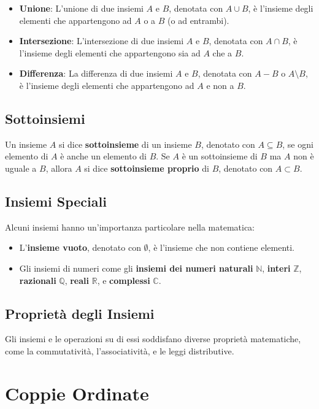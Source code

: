 \documentclass{article}
\begin{document}
\begin{itemize}
    \item \textbf{Unione}: L'unione di due insiemi $A$ e $B$, denotata con $A \cup B$, è l'insieme degli elementi che appartengono ad $A$ o a $B$ (o ad entrambi).
    \item \textbf{Intersezione}: L'intersezione di due insiemi $A$ e $B$, denotata con $A \cap B$, è l'insieme degli elementi che appartengono sia ad $A$ che a $B$.
    \item \textbf{Differenza}: La differenza di due insiemi $A$ e $B$, denotata con $A - B$ o $A \setminus B$, è l'insieme degli elementi che appartengono ad $A$ e non a $B$.
\end{itemize}

\subsection{Sottoinsiemi}
Un insieme $A$ si dice \textbf{sottoinsieme} di un insieme $B$, denotato con $A \subseteq B$, se ogni elemento di $A$ è anche un elemento di $B$. Se $A$ è un sottoinsieme di $B$ ma $A$ non è uguale a $B$, allora $A$ si dice \textbf{sottoinsieme proprio} di $B$, denotato con $A \subset B$.

\subsection{Insiemi Speciali}
Alcuni insiemi hanno un'importanza particolare nella matematica:

\begin{itemize}
    \item L'\textbf{insieme vuoto}, denotato con $\emptyset$, è l'insieme che non contiene elementi.
    \item Gli insiemi di numeri come gli \textbf{insiemi dei numeri naturali} $\mathbb{N}$, \textbf{interi} $\mathbb{Z}$, \textbf{razionali} $\mathbb{Q}$, \textbf{reali} $\mathbb{R}$, e \textbf{complessi} $\mathbb{C}$.
\end{itemize}

\subsection{Proprietà degli Insiemi}
Gli insiemi e le operazioni su di essi soddisfano diverse proprietà matematiche, come la commutatività, l'associatività, e le leggi distributive.

\section{Coppie Ordinate}
\end{document}
